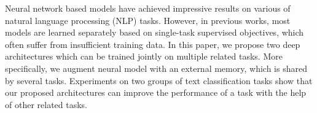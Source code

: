 Neural network based models have achieved impressive results on various of natural language processing (NLP) tasks. However, in previous works, most models are learned separately based on single-task supervised objectives, which often suffer from insufficient training data. In this paper, we propose two deep architectures which can be trained jointly on multiple related tasks. More specifically, we augment neural model with an external memory, which is shared by several tasks. Experiments on two groups of text classification tasks show that our proposed architectures can improve the performance of a task with the help of other related tasks.
